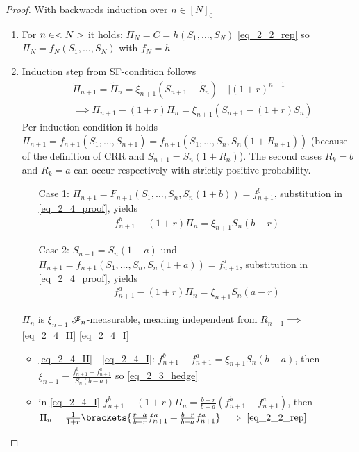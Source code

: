\begin{proof}
	With backwards induction over  $n \in [N]_0$ 
	\begin{enumerate}
		\item For $n \in <N>$ it holds: $\Pi_N = C = h(S_1, \dots, S_N)$ \eqref{eq_2_2_rep} so $\Pi_N = f_N(S_1, \dots, S_N)$ with $f_N = h$
		\item Induction step from SF-condition follows
		\begin{align*}
			&\tilde{\Pi}_{n+1} = \tilde{\Pi}_n = \xi_{n+1}(\tilde{S}_{n+1} - \tilde{S}_n) \quad | (1+r)^{n-1}\\
			&\implies \Pi_{n+1} - (1+r)\Pi_n = \xi_{n+1}(S_{n+1} - (1+r)S_n) \tag{$\ast$}\label{eq_2_4_proof}
		\end{align*}
		Per induction condition it holds $\Pi_{n+1} = f_{n+1}(S_1, \dots, S_{n+1}) = f_{n+1}(S_1, \dots, S_n, S_n (1+R_{n+1}))$ (because of the definition of CRR and $S_{n+1} = S_n(1+R_n)$).  The second cases $R_k = b$ and $R_k = a$ can occur respectively with strictly positive probability. 
		\begin{itemize}
			\item[Case 1:] $\Pi_{n+1} = F_{n+1}(S_1, \dots, S_n, S_n(1+b)) = f^b_{n+1}$, substitution in \eqref{eq_2_4_proof}, yields
			\begin{align*}
				f^b_{n+1} - (1+r)\Pi_n = \xi_{n+1}S_n(b-r) \tag{I}\label{eq_2_4_I}
			\end{align*}
			\item[Case 2:] $S_{n+1} = S_n(1-a)$ und $\Pi_{n+1} = f_{n+1}(S_1, \dots, S_n, S_n(1+a)) = f^a_{n+1}$, substitution in \eqref{eq_2_4_proof}, yields
			\begin{align*}
				f^a_{n+1} - (1+r)\Pi_n = \xi_{n+1}S_n(a-r) \tag{II}\label{eq_2_4_II}
			\end{align*}
		\end{itemize}
	$\Pi_n$ is $\xi_{n+1}$ $\mathscr F_n$-measurable, meaning independent from $R_{n-1} \implies$ \eqref{eq_2_4_II} \eqref{eq_2_4_I}
		\begin{itemize}
			\item \eqref{eq_2_4_II} - \eqref{eq_2_4_I}: $f^b_{n+1} - f^a_{n+1} = \xi_{n+1} S_n(b-a)$, then $\xi_{n+1} = \frac{f^b_{n+1} - f^a_{n+1}}{S_n(b-a)}$ so \eqref{eq_2_3_hedge} \checkmark
			\item in \eqref{eq_2_4_I} $f^b_{n+1}-(1+r)\Pi_n = \frac{b-r}{b-a}(f^b_{n+1}-f^a_{n+1})$, then $\Pi_n = \frac{1}{1+r} \brackets{\frac{r-a}{b-r}f^a_{n+1} + \frac{b-r}{b-a}f^a_{n+1}} \implies \eqref{eq_2_2_rep}$ \checkmark
		\end{itemize}
	\end{enumerate}
\end{proof}
